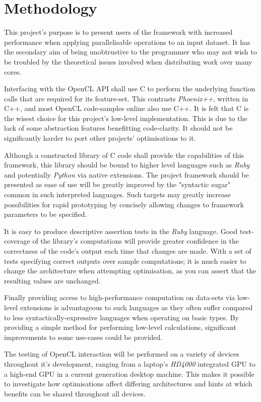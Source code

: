 \section{Methodology}
This project's purpose is to present users of the framework with increased performance when applying parallelisable operations to an input dataset.
It has the secondary aim of being unobtrustive to the programmer who may not wish to be troubled by the theoretical issues involved when distributing work over many cores.

Interfacing with the OpenCL API shall use C to perform the underlying function calls that are required for its feature-set.
This contrasts \emph{Phoenix++}, written in C++, and most OpenCL code-samples online also use C++.
It is felt that C is the wisest choice for this project's low-level implementation. This is due to the lack of some abstraction features benefitting code-clarity. It should not be significantly harder to port other projects' optimisations to it.

Although a constructed library of C code shall provide the capabilities of this framework, this library should be bound to higher level languages such as \emph{Ruby} and potentially \emph{Python} via native extensions. The project framework should be presented as ease of use will be greatly improved by the "syntactic sugar" common in such interpreted languages. Such targets may greatly increase possibilities for rapid prototyping by concisely allowing changes to framework parameters to be specified.

It is easy to produce descriptive assertion tests in the \emph{Ruby} language. Good test-coverage of the library's computations will provide greater confidence in the correctness of the code's output each time that changes are made. With a set of tests specifying correct outputs over sample computations; it is much easier to change the architecture when attempting optimisation, as you can assert that the resulting values are unchanged.

Finally providing access to high-performance computation on data-sets via low-level extensions is advantageous to such languages as they often suffer compared to less syntactically-expressive languages when operating on basic types. By providing a simple method for performing low-level calculations, significant improvements to some use-cases could be provided.

The testing of OpenCL interaction will be performed on a variety of devices throughout it's development, ranging from a laptop's \emph{HD4000} integrated GPU to a high-end GPU in a current generation desktop machine. This makes it possible to investigate how optimisations affect differing architectures and hints at which benefits can be shared throughout all devices.
